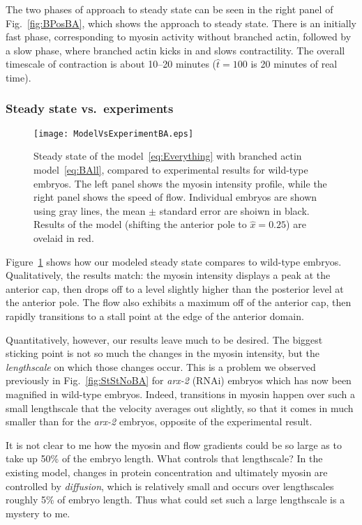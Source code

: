 \documentclass[11pt]{article}
\newcommand{\red}[1]{\color{red}#1\normalcolor}
\newcommand{\6}[1]{#1_{\text{6}}}
\newcommand{\3}[1]{#1_{\text{3}}}
\begin{document}
The two phases of approach to steady state can be seen in the right panel of Fig.\ \ref{fig:BPosBA}, which shows the approach to steady state. There is an initially fast phase, corresponding to myosin activity without branched actin, followed by a slow phase, where branched actin kicks in and slows contractility. The overall timescale of contraction is about 10--20 minutes ($\hat t =100$ is 20 minutes of real time). 

\subsubsection{Steady state vs.\ experiments}

\begin{figure}
\centering
\texttt{[image: ModelVsExperimentBA.eps]}
\caption{\label{fig:StStBA}Steady state of the model\ \eqref{eq:Everything} with branched actin model\ \eqref{eq:BAll}, compared to experimental results for wild-type embryos. The left panel shows the myosin intensity profile, while the right panel shows the speed of flow. Individual embryos are shown using gray lines, the mean $\pm$ standard error are shoiwn in black. Results of the model (shifting the anterior pole to $\hat x = 0.25$) are ovelaid in red.}
\end{figure}

Figure\ \ref{fig:StStBA} shows how our modeled steady state compares to wild-type embryos. Qualitatively, the results match: the myosin intensity displays a peak at the anterior cap, then drops off to a level slightly higher than the posterior level at the anterior pole. The flow also exhibits a maximum off of the anterior cap, then rapidly transitions to a stall point at the edge of the anterior domain.

\red{Quantitatively, however, our results leave much to be desired. The biggest sticking point is not so much the changes in the myosin intensity, but the \emph{lengthscale} on which those changes occur. This is a problem we observed previously in Fig.\ \ref{fig:StStNoBA} for \emph{arx-2} (RNAi) embryos which has now been magnified in wild-type embryos. Indeed, transitions in myosin happen over such a small lengthscale that the velocity averages out slightly, so that it comes in much smaller than for the \emph{arx-2} embryos, opposite of the experimental result.}

\red{It is not clear to me how the myosin and flow gradients could be so large as to take up 50\% of the embryo length. What controls that lengthscale? In the existing model, changes in protein concentration and ultimately myosin are controlled by \emph{diffusion}, which is relatively small and occurs over lengthscales roughly 5\% of embryo length. Thus what could set such a large lengthscale is a mystery to me.}





\end{document}
